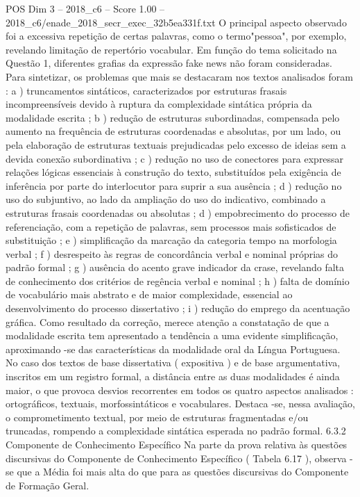 \begin{textsample}{POS Dim 3 – 2018\_c6 – Score 1.00 – 2018\_c6/enade\_2018\_secr\_exec\_32b5ea331f.txt}
O principal aspecto observado foi a excessiva repetição de certas palavras, como o termo"pessoa", por exemplo, revelando limitação de repertório vocabular.
Em função do tema solicitado na Questão 1, diferentes grafias da expressão fake news não foram consideradas.
Para sintetizar, os problemas que mais se destacaram nos textos analisados foram : a ) truncamentos sintáticos, caracterizados por estruturas frasais incompreensíveis devido à ruptura da complexidade sintática própria da modalidade escrita ; b ) redução de estruturas subordinadas, compensada pelo aumento na frequência de estruturas coordenadas e absolutas, por um lado, ou pela elaboração de estruturas textuais prejudicadas pelo excesso de ideias sem a devida conexão subordinativa ; c ) redução no uso de conectores para expressar relações lógicas essenciais à construção do texto, substituídos pela exigência de inferência por parte do interlocutor para suprir a sua ausência ; d ) redução no uso do subjuntivo, ao lado da ampliação do uso do indicativo, combinado a estruturas frasais coordenadas ou absolutas ; d ) empobrecimento do processo de referenciação, com a repetição de palavras, sem processos mais sofisticados de substituição ; e ) simplificação da marcação da categoria tempo na morfologia verbal ; f ) desrespeito às regras de concordância verbal e nominal próprias do padrão formal ; g ) ausência do acento grave indicador da crase, revelando falta de conhecimento dos critérios de regência verbal e nominal ; h ) falta de domínio de vocabulário mais abstrato e de maior complexidade, essencial ao desenvolvimento do processo dissertativo ; i ) redução do emprego da acentuação gráfica.
Como resultado da correção, merece atenção a constatação de que a modalidade escrita tem apresentado a tendência a uma evidente simplificação, aproximando -se das características da modalidade oral da Língua Portuguesa.
No caso dos textos de base dissertativa ( expositiva ) e de base argumentativa, inscritos em um registro formal, a distância entre as duas modalidades é ainda maior, o que provoca desvios recorrentes em todos os quatro aspectos analisados : ortográficos, textuais, morfossintáticos e vocabulares.
Destaca -se, nessa avaliação, o comprometimento textual, por meio de estruturas fragmentadas e/ou truncadas, rompendo a complexidade sintática esperada no padrão formal. 6.3.2 Componente de Conhecimento Específico Na parte da prova relativa às questões discursivas do Componente de Conhecimento Específico ( Tabela 6.17 ), observa -se que a Média foi mais alta do que para as questões discursivas do Componente de Formação Geral.

\end{textsample}
